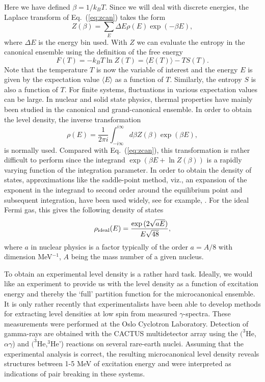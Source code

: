\documentclass[preprint,rmp,aps,floatfix]{revtex4}
\begin{document}
Here we have defined $\beta=1/k_BT$. Since we will 
deal with discrete energies, the 
Laplace transform of Eq.\ (\ref{eq:zcan}) takes the form
\begin{equation}
         Z(\beta)=\sum_E \Delta E\rho(E)\exp{(-\beta E)},
         \label{eq:zactual}
\end{equation}
where $\Delta E$ is the energy bin used.
With $Z$ we can evaluate the 
entropy in the canonical ensemble using the definition of the 
free energy 
\begin{equation}
     F(T)= -k_B T \ln Z(T)=\langle E(T)\rangle - TS(T).
\end{equation}
Note that the temperature $T$ is now the variable of 
interest and the energy $E$ is given by the expectation 
value $\langle E\rangle$ as a function of $T$. Similarly, 
the entropy $S$ is also a function of $T$.
For finite systems, fluctuations in various 
expectation values can be large.
In nuclear and solid state physics, thermal properties have 
mainly been studied in the canonical and grand-canonical ensemble. 
In order to obtain the level density, the inverse transformation 
\begin{equation}
      \rho(E) =\frac{1}{2\pi i}\int_{-i\infty}^{i\infty}
 d\beta Z(\beta) \exp{(\beta E)},
      \label{eq:zbigcan}
\end{equation}
is normally used. Compared with Eq.\ (\ref{eq:zcan}), this 
transformation is rather difficult to perform since 
the integrand $\exp{\left(\beta E+ \ln Z(\beta)\right)}$ is a 
rapidly varying function of the integration parameter. In order to obtain 
the density of states, approximations like the saddle-point 
method, viz., an expansion of the exponent in the integrand 
to second order around the equilibrium point and subsequent integration, 
have been used widely,
see for example,  \cite{kdl97,yoram,WK00}. 
For the ideal Fermi gas, this gives the following density of states
\begin{equation}
      \rho_{\rm ideal}(E)=\frac{\exp{(2\sqrt{aE})}}{E\sqrt{48}},
      \label{eq:omegaideal}
\end{equation}
where $a$ in nuclear physics is a factor 
typically of the order $a=A/8$ with dimension 
MeV$^{-1}$, $A$ being the mass number of a given nucleus. 



To obtain an experimental level density is a rather hard task.
Ideally, we would like an experiment to provide us with the level 
density as a function of excitation energy and thereby 
the `full' partition function for the microcanonical ensemble. 
It is only rather recently that 
experimentalists have been able to develop methods 
\cite{oslo1,oslo2} for extracting level densities at low spin from
measured $\gamma$-spectra. 
These measurements were performed at the Oslo 
Cyclotron Laboratory. Detection of gamma-rays are obtained with the
CACTUS multidetector array \cite{oslo3} using the $(^3$He,$\alpha \gamma$)
and $(^3$He,$^3$He')
reactions on several rare-earth nuclei.
Assuming that the
experimental analysis is correct,   
the resulting microcanonical 
level density reveals structures between 1-5 MeV of excitation energy
and were interpreted as indications of pair breaking in these systems. 
\end{document}
